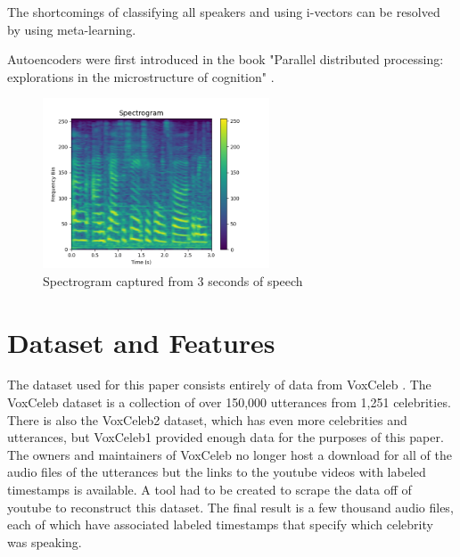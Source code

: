 \documentclass{article}
\begin{document}
The shortcomings of classifying all speakers and using i-vectors can be resolved by using meta-learning. 

Autoencoders were first introduced in the book "Parallel distributed processing: explorations in the microstructure of 
cognition" \cite{ParallelDistributedProcessing}.


\begin{figure}
  \centering
  \includegraphics[width=0.6\textwidth]{Images/spectrogram_example.png}
  \caption{Spectrogram captured from 3 seconds of speech}
  \label{fig:SpectrogramExample}
\end{figure}

\section{Dataset and Features}
The dataset used for this paper consists entirely of data from VoxCeleb \cite{DBLP:journals/corr/NagraniCZ17}. The 
VoxCeleb dataset is a collection of over 150,000 utterances from 1,251 celebrities. There is also the VoxCeleb2 \cite{Chung18b} 
dataset, which has even more celebrities and utterances, but VoxCeleb1 provided enough data for the purposes of this paper.
The owners and maintainers of VoxCeleb no longer host a download for all of the audio files of the utterances but the 
links to the youtube videos with labeled timestamps is available. A tool had to be created to scrape the data off of
youtube to reconstruct this dataset. The final result is a few thousand audio files, each of which have associated labeled
timestamps that specify which celebrity was speaking.
\end{document}
